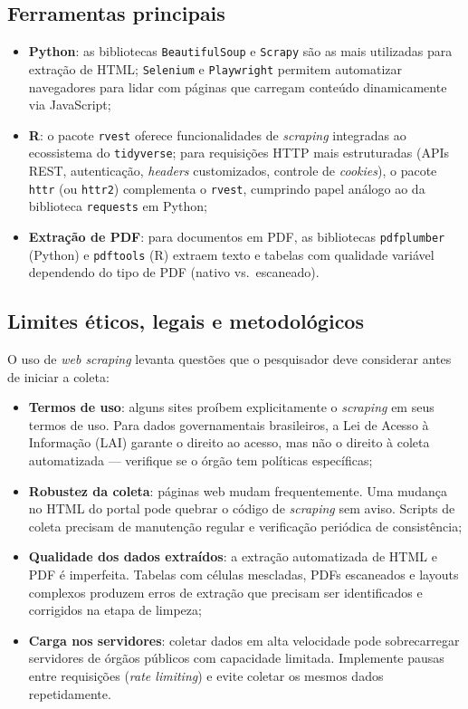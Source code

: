 \subsection{Ferramentas principais}

\begin{itemize}
  \item \textbf{Python}: as bibliotecas \texttt{BeautifulSoup} e \texttt{Scrapy} são as mais utilizadas para extração de HTML; \texttt{Selenium} e \texttt{Playwright} permitem automatizar navegadores para lidar com páginas que carregam conteúdo dinamicamente via JavaScript;
  \item \textbf{R}: o pacote \texttt{rvest} oferece funcionalidades de \textit{scraping} integradas ao ecossistema do \texttt{tidyverse}; para requisições HTTP mais estruturadas (APIs REST, autenticação, \textit{headers} customizados, controle de \textit{cookies}), o pacote \texttt{httr} (ou \texttt{httr2}) complementa o \texttt{rvest}, cumprindo papel análogo ao da biblioteca \texttt{requests} em Python;
  \item \textbf{Extração de PDF}: para documentos em PDF, as bibliotecas \texttt{pdfplumber} (Python) e \texttt{pdftools} (R) extraem texto e tabelas com qualidade variável dependendo do tipo de PDF (nativo vs.\ escaneado).
\end{itemize}

\subsection{Limites éticos, legais e metodológicos}

O uso de \textit{web scraping} levanta questões que o pesquisador deve considerar antes de iniciar a coleta:

\begin{itemize}
  \item \textbf{Termos de uso}: alguns sites proíbem explicitamente o \textit{scraping} em seus termos de uso. Para dados governamentais brasileiros, a Lei de Acesso à Informação (LAI) garante o direito ao acesso, mas não o direito à coleta automatizada --- verifique se o órgão tem políticas específicas;

  \item \textbf{Robustez da coleta}: páginas web mudam frequentemente. Uma mudança no HTML do portal pode quebrar o código de \textit{scraping} sem aviso. Scripts de coleta precisam de manutenção regular e verificação periódica de consistência;

  \item \textbf{Qualidade dos dados extraídos}: a extração automatizada de HTML e PDF é imperfeita. Tabelas com células mescladas, PDFs escaneados e layouts complexos produzem erros de extração que precisam ser identificados e corrigidos na etapa de limpeza;

  \item \textbf{Carga nos servidores}: coletar dados em alta velocidade pode sobrecarregar servidores de órgãos públicos com capacidade limitada. Implemente pausas entre requisições (\textit{rate limiting}) e evite coletar os mesmos dados repetidamente.
\end{itemize}

